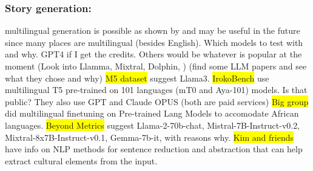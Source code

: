 
\subsubsection{Story generation: }
multilingual generation is possible as shown by \cite{nambi2023breakinglanguagebarriersleap} and may be useful in the future since many places are multilingual (besides English). 
Which models to test with and why. GPT4 if I get the credits. Others would be whatever is popular at the moment (Look into Llamma, Mixtral, Dolphin, ) (find some LLM papers and see what they chose and why)
\colorbox{yellow}{M5 dataset} \cite{schneider2024m}  suggest Llama3.
\colorbox{yellow}{IrokoBench} \cite{adelani2024irokobenchnewbenchmarkafrican} use multilingual T5 pre-trained on 101 languages (mT0 and Aya-101) models. Is that public? They also use GPT and Claude OPUS (both are paid services)
\colorbox{yellow}{Big group} \cite{alabi-etal-2022-adapting} did multilingual finetuning on Pre-trained Lang Models to accomodate African languages. 
\colorbox{yellow}{Beyond Metrics} \cite{ochieng2024beyond} suggest Llama-2-70b-chat, Mistral-7B-Instruct-v0.2, Mixtral-8x7B-Instruct-v0.1, Gemma-7b-it, with reasons why.
\colorbox{yellow}{Kim and friends} \cite{Kim2024Context-Aware-Gen} have info on NLP methods for sentence reduction and abstraction that can help extract cultural elements from the input.


